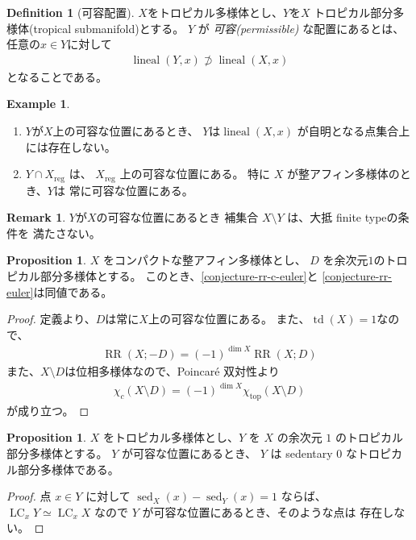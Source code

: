 \documentclass[a4paper,dvipdfmx,reqno,12pt]{amsart}
\theoremstyle{definition}
\newtheorem{definition}[theorem]{Definition}
\newtheorem{example}[theorem]{Example}
\newtheorem{proposition}[theorem]{Proposition}
\newtheorem{remark}[theorem]{Remark}
\newcommand{\opn}[1]{\operatorname{#1}}
\numberwithin{equation}{section}
\begin{document}
\begin{definition}[{可容配置}]
\label{definition-permissible-position}
$X$をトロピカル多様体とし、$Y$を$X$
トロピカル部分多様体(tropical submanifold)とする。
$Y$ が \emph{可容(permissible)} な配置にあるとは、
任意の$x\in Y$に対して
\begin{align}
     \opn{lineal}(Y,x)\not \supset \opn{lineal}(X,x)
\end{align}
となることである。
\end{definition}

\begin{example}
\begin{enumerate}
\item $Y$が$X$上の可容な位置にあるとき、
$Y$は$\opn{lineal}(X,x)$
が自明となる点集合上には存在しない。
\item $Y\cap X_{\mathrm{reg}}$ は、
$X_{\mathrm{reg}}$ 上の可容な位置にある。
特に $X$ が整アフィン多様体のとき、$Y$は
常に可容な位置にある。
\end{enumerate}

\end{example}

\begin{remark}
$Y$が$X$の可容な位置にあるとき
補集合 $X\setminus Y$ は、大抵 finite typeの条件を
満たさない。
\end{remark}

\begin{proposition}
$X$ をコンパクトな整アフィン多様体とし、
$D$ を余次元$1$のトロピカル部分多様体とする。
このとき、\cref{conjecture-rr-c-euler}と
\cref{conjecture-rr-euler}は同値である。
\end{proposition}
\begin{proof}
定義より、$D$は常に$X$上の可容な位置にある。
また、$\opn{td}(X)=1$なので、
\begin{align}
\opn{RR}(X;-D)=(-1)^{\dim X}\opn{RR}(X;D)
\end{align}
また、$X\setminus D$は位相多様体なので、Poincar\'e 双対性より
\begin{align}
\chi_c(X\setminus D)=(-1)^{\dim X}\chi_{\mathrm{top}}(X\setminus D)
\end{align}
が成り立つ。
\end{proof}



\begin{proposition}
$X$ をトロピカル多様体とし、$Y$ を
$X$ の余次元 $1$
のトロピカル部分多様体とする。
$Y$ が可容な位置にあるとき、
$Y$ は sedentary 0 なトロピカル部分多様体である。
\end{proposition}
\begin{proof}
点 $x\in Y$ に対して
$\opn{sed}_X(x)-\opn{sed}_Y(x)=1$ ならば、
$\opn{LC}_xY\simeq \opn{LC}_x X$ なので
$Y$ が可容な位置にあるとき、そのような点は
存在しない。
\end{proof}
\end{document}
